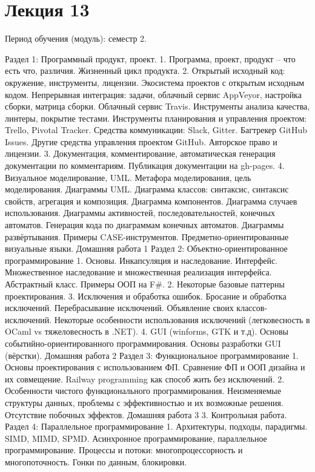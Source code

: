\section{Лекция 13}
 

Период обучения (модуль): семестр 2.

Раздел 1: Программный продукт, проект.
    1. Программа, проект, продукт – что есть что, различия. Жизненный цикл продукта.
    2. Открытый исходный код: окружение, инструменты, лицензии. Экосистема проектов с открытым исходным кодом. Непрерывная интеграция: задачи, облачный сервис AppVeyor, настройка сборки, матрица сборки. Облачный сервис Travis. Инструменты анализа качества, линтеры, покрытие тестами. Инструменты планирования и управления проектом: Trello, Pivotal Tracker. Средства коммуникации: Slack, Gitter. Багтрекер GitHub Issues. Другие средства управления проектом GitHub. Авторское право и лицензии.
    3. Документация, комментирование, автоматическая генерация документации по комментариям. Публикация документации на gh-pages.
    4. Визуальное моделирование, UML. Метафора моделирования, цель моделирования. Диаграммы UML. Диаграмма классов: синтаксис, синтаксис свойств, агрегация и композиция. Диаграмма компонентов. Диаграмма случаев использования. Диаграммы активностей, последовательностей, конечных автоматов. Генерация кода по диаграммам конечных автоматов. Диаграммы развёртывания. Примеры CASE-инструментов. Предметно-ориентированные визуальные языки.
Домашняя работа 1
Раздел 2: Объектно-ориентированное программирование
    1. Основы. Инкапсуляция и наследование. Интерфейс. Множественное наследование и множественная реализация интерфейса. Абстрактный класс. Примеры ООП на F#. 
    2. Некоторые базовые паттерны проектирования.
    3. Исключения и обработка ошибок. Бросание и обработка исключений. Перебрасывание исключений. Объявление своих классов-исключений. Некоторые особенности использования исключений (легковесность в OCaml vs тяжеловесность в .NET).
    4. GUI (winforms, GTK и т.д). Основы событийно-ориентированного программирования. Основы разработки GUI (вёрстки).
Домашняя работа 2
Раздел 3: Функциональное программирование
    1. Основы проектирования с использованием ФП. Сравнение ФП и ООП дизайна и их совмещение.  Railway programming как способ жить без исключений. 
    2. Особенности чистого функционального программирования. Неизменяемые структуры данных, проблемы с эффективностью и их возможные решения. Отсутствие побочных эффектов.
Домашняя работа 3 
    3. Контрольная работа.
Раздел 4: Параллельное программирование
    1. Архитектуры, подходы, парадигмы. SIMD, MIMD, SPMD. Асинхронное программирование, параллельное программирование. Процессы и потоки: многопроцессорность и многопоточность. Гонки по данным, блокировки.  
